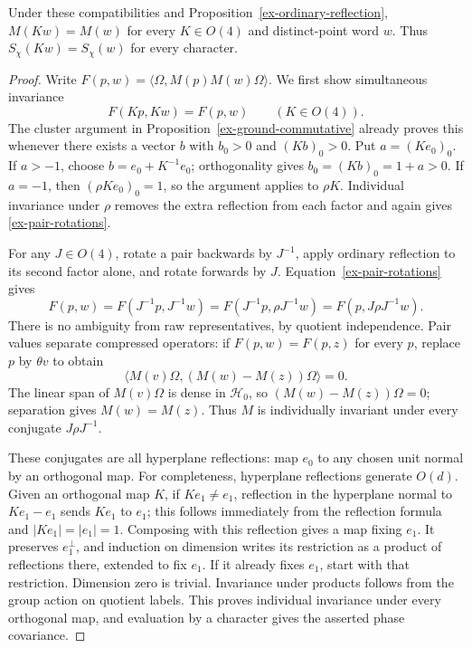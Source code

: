 \begin{proposition}
\label{ex-individual-rotations}
Under these compatibilities and Proposition~\ref{ex-ordinary-reflection},
\(M(Kw)=M(w)\) for every \(K\in O(4)\) and distinct-point word \(w\).
Thus \(S_\chi(Kw)=S_\chi(w)\) for every character.
\end{proposition}
\begin{proof}
Write \(F(p,w)=\langle\Omega,M(p)M(w)\Omega\rangle\).
We first show simultaneous invariance
\begin{equation}\label{ex-pair-rotations}
 F(Kp,Kw)=F(p,w)\qquad(K\in O(4)).
\end{equation}
The cluster argument in Proposition~\ref{ex-ground-commutative} already
proves this whenever there exists a vector \(b\) with \(b_0>0\) and
\((Kb)_0>0\). Put \(a=(Ke_0)_0\). If \(a>-1\), choose
\(b=e_0+K^{-1}e_0\); orthogonality gives
\(b_0=(Kb)_0=1+a>0\). If \(a=-1\), then
\((\rho Ke_0)_0=1\), so the argument applies to \(\rho K\).
Individual invariance under \(\rho\) removes the extra reflection
from each factor and again gives \eqref{ex-pair-rotations}.

For any \(J\in O(4)\), rotate a pair backwards by \(J^{-1}\),
apply ordinary reflection to its second factor alone, and rotate forwards
by \(J\). Equation~\eqref{ex-pair-rotations} gives
\[
 F(p,w)=F(J^{-1}p,J^{-1}w)
       =F(J^{-1}p,\rho J^{-1}w)
       =F(p,J\rho J^{-1}w).
\]
There is no ambiguity from raw representatives, by quotient independence.
Pair values separate compressed operators: if \(F(p,w)=F(p,z)\) for
every \(p\), replace \(p\) by \(\theta v\) to obtain
\[
 \langle M(v)\Omega,(M(w)-M(z))\Omega\rangle=0.
\]
The linear span of \(M(v)\Omega\) is dense in \(\mathcal H_0\),
so \((M(w)-M(z))\Omega=0\); separation gives \(M(w)=M(z)\).
Thus \(M\) is individually invariant under every conjugate
\(J\rho J^{-1}\).

These conjugates are all hyperplane reflections: map \(e_0\) to any
chosen unit normal by an orthogonal map. For completeness, hyperplane
reflections generate \(O(d)\). Given an orthogonal map \(K\), if
\(Ke_1\ne e_1\), reflection in the hyperplane normal to
\(Ke_1-e_1\) sends \(Ke_1\) to \(e_1\); this follows immediately
from the reflection formula and \(|Ke_1|=|e_1|=1\). Composing with
this reflection gives a map fixing \(e_1\). It preserves
\(e_1^\perp\), and induction on dimension writes its restriction as
a product of reflections there, extended to fix \(e_1\). If it already
fixes \(e_1\), start with that restriction. Dimension zero is trivial.
Invariance under products follows from the group action on quotient
labels. This proves individual invariance under every orthogonal map,
and evaluation by a character gives the asserted phase covariance.
\end{proof}

